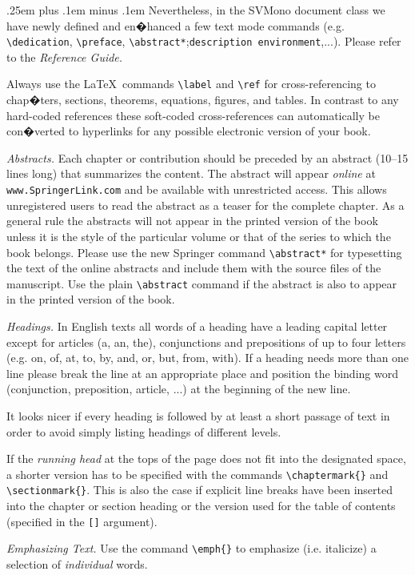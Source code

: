 \documentclass[graybox]{svmono}
\begin{document}
{\spaceskip .25em plus .1em minus .1em Nevertheless, in the {\sc SVMono} document class we have newly defined and en�hanced a few text mode commands (e.g. \verb|\dedication|, \verb|\preface|, \verb|\abstract*|;\break \verb|description environment|,...). Please refer to the {\it Reference Guide.}}

Always use the \LaTeX~commands \verb|\label| and \verb|\ref| for cross-referencing to chap�ters, sections, theorems, equations, figures, and tables. In contrast to any hard-coded references these soft-coded cross-references can automatically be con�verted to hyperlinks for any possible electronic version of your book.

{\it Abstracts.} Each chapter or contribution should be preceded by an abstract (10--15 lines long) that summarizes the content. The abstract will appear {\it online} at {\tt www.SpringerLink.com} and be available with unrestricted access. This allows unregistered users to read the abstract as a teaser for the complete chapter. As a general rule the abstracts will not appear in the printed version of the book unless it is the style of the particular volume or that of the series to which the book belongs. Please use the new Springer command \verb|\abstract*| for typesetting the text of the online abstracts and include them with the source files of the manuscript. Use the plain \verb|\abstract| command if the abstract is also to appear in the printed version of the book.

{\it Headings.} In English texts all words of a heading have a leading capital letter except for articles (a, an, the), conjunctions and prepositions of up to four letters (e.g. on, of, at, to, by, and, or, but, from, with). If a heading needs more than one line please break the line at an appropriate place and position the binding word (conjunction, preposition, article, ...) at the beginning of the new line.

It looks nicer if every heading is followed by at least a short passage of text in order to avoid simply listing headings of different levels.

If the {\it running head} at the tops of the page does not fit into the designated space, a shorter version has to be specified with the commands \verb|\chaptermark{}| and \verb|\sectionmark{}|. This is also the case if explicit line breaks have been inserted into the chapter or section heading or the version used for the table of contents (specified in the \verb|[]| argument).

{\it Emphasizing Text.} Use the command \verb|\emph{}| to emphasize (i.e. italicize) a selection of {\it individual} words.
\end{document}
